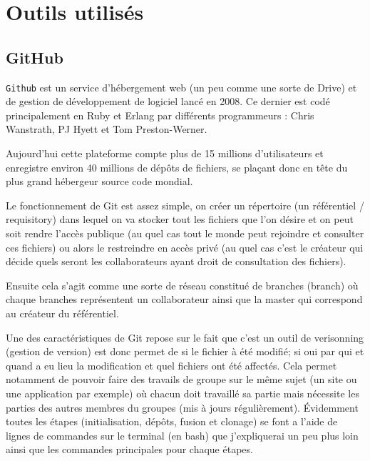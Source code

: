 \documentclass[a4paper, 12pt, twoside]{article}
\begin{document}
\section{Outils utilisés}
\subsection{GitHub}
\texttt{Github} est un service d'hébergement web (un peu comme une sorte de Drive) et de gestion de développement de logiciel lancé en 2008. Ce dernier est codé principalement en Ruby et Erlang par différents programmeurs : Chris Wanstrath, PJ Hyett et Tom Preston-Werner.\newline

Aujourd'hui cette plateforme compte plus de 15 millions d'utilisateurs et enregistre environ 40 millions de dépôts de fichiers,
se plaçant donc en tête du plus grand hébergeur source code mondial. \newline

Le fonctionnement de Git est assez simple, on créer un répertoire (un référentiel / requisitory) dans lequel on va stocker tout les fichiers que l'on désire et on peut soit rendre l'accès publique (au quel cas tout le monde peut rejoindre et consulter ces fichiers) ou alors le  restreindre en accès privé (au quel cas c'est le créateur qui décide quels seront les collaborateurs ayant droit de consultation des fichiers). \newline

Ensuite cela s'agit comme une sorte de réseau constitué de branches (branch) où chaque branches représentent un collaborateur ainsi que la master qui correspond au créateur du référentiel. \newline

Une des caractéristiques de Git repose sur le fait que c'est un outil de verisonning (gestion de version) est donc permet de si le fichier à été modifié; si oui par qui et quand a eu lieu la modification et quel fichiers ont été affectés. Cela permet notamment de pouvoir faire
des travails de groupe sur le même sujet (un site ou une application par exemple) où chacun doit travaillé sa partie mais nécessite les parties des autres membres du groupes (mis à jours régulièrement). \newline
Évidemment toutes les étapes (initialisation, dépôts, fusion et clonage) se font a l'aide de lignes de commandes sur le terminal (en bash) que j'expliquerai un peu plus loin ainsi que les commandes principales pour chaque étapes.\newline
\end{document}
